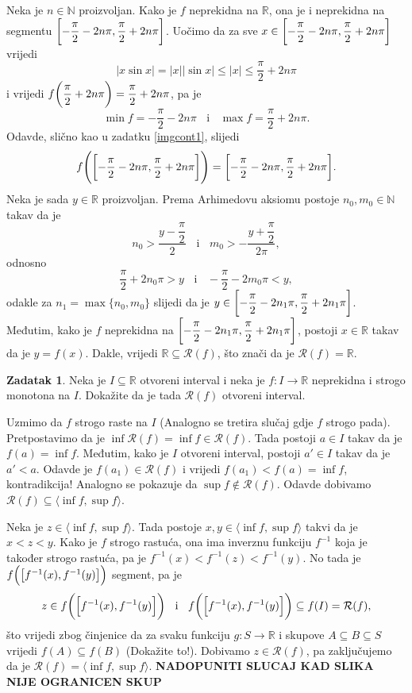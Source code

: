 \documentclass{book}
\let\originalleft\left
\let\originalright\right
\renewcommand{\left}{\mathopen{}\mathclose\bgroup\originalleft}
\renewcommand{\right}{\aftergroup\egroup\originalright}
\renewenvironment{proof}{%
    \vspace{-\parskip}\begin{oldproof}%
    }{%
    \end{oldproof}%
}
\theoremstyle{definition}
\theoremstyle{definition}
\newtheorem{exercise}{Zadatak}
\theoremstyle{remark}
\begin{document}
\begin{proof}[Rješenje]
Neka je $n\in \mathbb{N}$ proizvoljan. Kako je $f$ neprekidna na $\mathbb{R}$, ona je i neprekidna na segmentu $\left[-\dfrac{\pi}{2}-2n\pi, \dfrac{\pi}{2}+2n\pi\right]$. Uočimo da za sve $x\in \left[-\dfrac{\pi}{2}-2n\pi, \dfrac{\pi}{2}+2n\pi\right]$ vrijedi 
$$|x\sin{x}|=|x||\sin{x}|\leq |x|\leq \dfrac{\pi}{2}+2n\pi$$
i vrijedi $f\left(\dfrac{\pi}{2}+2n\pi\right)=\dfrac{\pi}{2}+2n\pi$, pa je $$\min{f}=-\dfrac{\pi}{2}-2n\pi\;\;\text{ i }\;\;\max{f}=\dfrac{\pi}{2}+2n\pi.$$
Odavde, slično kao u zadatku \ref{imgcont1}, slijedi $$f\left(\left[-\dfrac{\pi}{2}-2n\pi, \dfrac{\pi}{2}+2n\pi\right]\right)=\left[-\dfrac{\pi}{2}-2n\pi, \dfrac{\pi}{2}+2n\pi\right].$$
Neka je sada $y\in \mathbb{R}$ proizvoljan. Prema Arhimedovu aksiomu postoje $n_0, m_0\in \mathbb{N}$ takav da je 
$$n_0>\dfrac{y-\dfrac{\pi}{2}}{2}\;\;\text{ i }\;\; m_0>-\dfrac{y+\dfrac{\pi}{2}}{2\pi},$$
odnosno
$$\dfrac{\pi}{2}+2n_0\pi>y\;\;\text{ i }\;\;-\dfrac{\pi}{2}-2m_0\pi<y,$$
odakle za $n_1=\max\{n_0, m_0\}$ slijedi da je $y\in \left[-\dfrac{\pi}{2}-2n_1\pi, \dfrac{\pi}{2}+2n_1\pi\right]$. Međutim, kako je $f$ neprekidna na $\left[-\dfrac{\pi}{2}-2n_1\pi, \dfrac{\pi}{2}+2n_1\pi\right]$, postoji $x\in \mathbb{R}$ takav da je $y=f(x)$. Dakle, vrijedi $\mathbb{R}\subseteq \mathcal{R}(f)$, što znači da je $\mathcal{R}(f)=\mathbb{R}$.
\end{proof}
\begin{exercise}
Neka je $I\subseteq \mathbb{R}$ otvoreni interval i neka je $f : I\to \mathbb{R}$ neprekidna i strogo monotona na $I$. Dokažite da je tada $\mathcal{R}(f)$ otvoreni interval.
\end{exercise}
\begin{proof}
Uzmimo da $f$ strogo raste na $I$ (Analogno se tretira slučaj gdje $f$ strogo pada). Pretpostavimo da je $\inf{\mathcal{R}(f)}=\inf{f}\in \mathcal{R}(f)$. Tada postoji $a\in I$ takav da je $f(a)=\inf{f}$. Međutim, kako je $I$ otvoreni interval, postoji $a'\in I$ takav da je $a'<a$. Odavde je $f(a_1)\in \mathcal{R}(f)$ i vrijedi $f(a_1)<f(a)=\inf{f}$, kontradikcija! Analogno se pokazuje da $\sup{f}\notin \mathcal{R}(f)$. Odavde dobivamo $\mathcal{R}(f)\subseteq \langle \inf{f}, \sup{f} \rangle$.

Neka je $z\in \langle \inf{f}, \sup{f} \rangle$. Tada postoje $x, y\in \langle \inf{f}, \sup{f} \rangle$ takvi da je $x<z<y$. Kako je $f$ strogo rastuća, ona ima inverznu funkciju $f^{-1}$ koja je također strogo rastuća, pa je $f^{-1}(x)<f^{-1}(z)<f^{-1}(y)$. No tada je $f\left(\left[f^{-1}(x), f^{-1}(y)\right]\right)$ segment, pa je $$z\in f\left(\left[f^{-1}(x), f^{-1}(y)\right]\right)\;\;\text{ i }\;\;f\left(\left[f^{-1}(x), f^{-1}(y)\right]\right)\subseteq f(I)=\mathcal{R}(f),$$
što vrijedi zbog činjenice da za svaku funkciju $g : S\to \mathbb{R}$ i skupove $A\subseteq B\subseteq S$ vrijedi $f(A)\subseteq f(B)$ (Dokažite to!).
Dobivamo $z\in \mathcal{R}(f)$, pa zaključujemo da je $\mathcal{R}(f)=\langle \inf{f}, \sup{f}\rangle$.
\textbf{NADOPUNITI SLUCAJ KAD SLIKA NIJE OGRANICEN SKUP}
\end{proof}
\newpage
\end{document}
